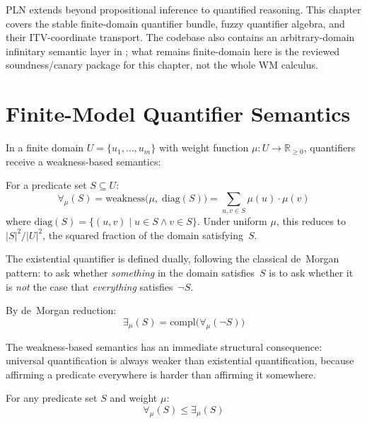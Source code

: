 \documentclass[11pt,openany]{report}
\begin{document}
PLN extends beyond propositional inference to quantified reasoning.
This chapter covers the stable finite-domain quantifier bundle, fuzzy
quantifier algebra, and their ITV-coordinate transport.  The codebase
also contains an arbitrary-domain infinitary semantic layer in
; what remains
finite-domain here is the reviewed soundness/canary package for this
chapter, not the whole WM calculus.

\section{Finite-Model Quantifier Semantics}

In a finite domain $U = \{u_1, \ldots, u_m\}$ with weight function
$\mu : U \to \mathbb{R}_{\ge 0}$, quantifiers receive a
weakness-based semantics:

\begin{definition}
For a predicate set $S \subseteq U$:
\[
  \forall_\mu(S) = \mathrm{weakness}\big(\mu,\; \mathrm{diag}(S)\big)
  = \sum_{u, v \in S} \mu(u) \cdot \mu(v)
\]
where $\mathrm{diag}(S) = \{(u,v) \mid u \in S \wedge v \in S\}$.
Under uniform $\mu$, this reduces to $|S|^2/|U|^2$, the squared fraction
of the domain satisfying~$S$.
\end{definition}

The existential quantifier is defined dually, following the classical
de~Morgan pattern: to ask whether \emph{something} in the domain
satisfies~$S$ is to ask whether it is \emph{not} the case that
\emph{everything} satisfies~$\neg S$.

\begin{definition}
By de~Morgan reduction:
\[
  \exists_\mu(S) = \mathrm{compl}\big(\forall_\mu(\neg S)\big)
\]
\end{definition}

The weakness-based semantics has an immediate structural consequence:
universal quantification is always weaker than existential quantification,
because affirming a predicate everywhere is harder than affirming it
somewhere.

\begin{theorem}
For any predicate set $S$ and weight $\mu$:
\[
  \forall_\mu(S) \le \exists_\mu(S)
\]
\end{theorem}
\end{document}
